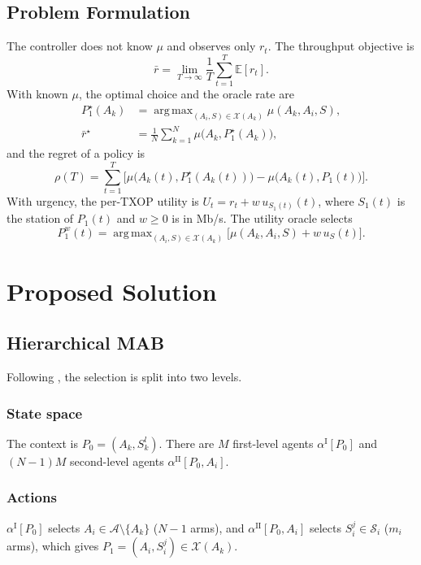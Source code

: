 \documentclass[journal]{IEEEtran}
\DeclareMathOperator*{\argmax}{arg\,max}
\theoremstyle{definition}
\theoremstyle{remark}
\theoremstyle{plain}
\begin{document}
\subsection{Problem Formulation}
The controller does not know $\mu$ and observes only $r_t$. The throughput objective is
\begin{equation}\label{eq:objective}
\bar{r}=\lim_{T\to\infty}\frac{1}{T}\sum_{t=1}^{T}\mathbb{E}[r_t].
\end{equation}
With known $\mu$, the optimal choice and the oracle rate are
\begin{align}
P_1^\star(A_k)&=\argmax_{(A_i,S)\in\mathcal{X}(A_k)}\mu(A_k,A_i,S),\label{eq:oracle}\\
\bar{r}^\star&=\frac{1}{N}\sum_{k=1}^{N}\mu\big(A_k,P_1^\star(A_k)\big),\label{eq:oracleavg}
\end{align}
and the regret of a policy is
\begin{equation}\label{eq:regret}
\rho(T)=\sum_{t=1}^{T}\Big[\mu\big(A_k(t),P_1^\star(A_k(t))\big)-\mu\big(A_k(t),P_1(t)\big)\Big].
\end{equation}
With urgency, the per-TXOP utility is $U_t=r_t+w\,u_{S_1(t)}(t)$, where $S_1(t)$ is the station of $P_1(t)$ and $w\geq0$ is in Mb/s. The utility oracle selects
\begin{equation}\label{eq:oracleu}
P_1^{w}(t)=\argmax_{(A_i,S)\in\mathcal{X}(A_k)}\big[\mu(A_k,A_i,S)+w\,u_S(t)\big].
\end{equation}

\section{Proposed Solution}\label{sec3}
\subsection{Hierarchical MAB}
Following \cite{wojnar2025hmab}, the selection is split into two levels.

\subsubsection{State space}
The context is $P_0=(A_k,S_k^l)$. There are $M$ first-level agents $\alpha^{\mathrm{I}}[P_0]$ and $(N-1)M$ second-level agents $\alpha^{\mathrm{II}}[P_0,A_i]$.

\subsubsection{Actions}
$\alpha^{\mathrm{I}}[P_0]$ selects $A_i\in\mathcal{A}\setminus\{A_k\}$ ($N-1$ arms), and $\alpha^{\mathrm{II}}[P_0,A_i]$ selects $S_i^j\in\mathcal{S}_i$ ($m_i$ arms), which gives $P_1=(A_i,S_i^j)\in\mathcal{X}(A_k)$.
\end{document}
